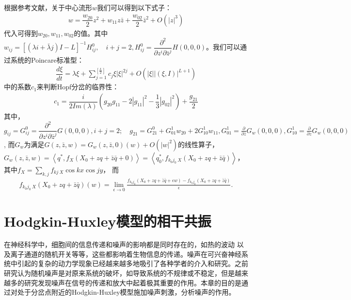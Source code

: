 \documentclass[
bachelor,
nofont, %
pdflinks,
]{xjtuthesis}
\begin{document}
根据参考文献\cite{hassard1981theory}，关于中心流形$w$我们可以得到以下式子：
\begin{align}
w=\dfrac{w_{20}}{2}z^2 +w_{11}z\bar{z}+\dfrac{w_{02}}{2}\bar{z}^2 +O(|z|^3)
\end{align}
代入可得到$w_{20},w_{11},w_{02}$的值。其中$w_{ij}=[(\lambda i+\bar{\lambda}j)I-L]^{-1}H^0_{ij},\quad i+j=2, H^0_{ij}=\dfrac{\partial^2}{\partial z^i \partial \bar{z}^j}H(0, 0, 0)$。我们可以通过系统的Poincare标准型：
\begin{align}
\dfrac{d \xi}{dt} =\lambda \xi+\sum_{j=1}^{\left[\frac{L}{2}\right]}c_j \xi|\xi|^{2j}+O(|\xi||(\xi,I)|^{L+1})
\end{align}
中的系数$c_1$来判断Hopf分岔的临界性：
\begin{align}
c_1=\dfrac{i}{2 Im(\lambda)}(g_{20}g_{11}-2|g_{11}|^2-\dfrac{1}{3}|g_{02}|^2)+\dfrac{g_{21}}{2}
\end{align}
其中，$g_{ij}=G^0_{ij}=\dfrac{\partial^2}{\partial z^i \partial \bar{z}^j}G(0, 0, 0), i + j = 2; \quad g_{21}=G^0_{21}+G^1_{01}w_{20}+2G^1_{10}w_{11},G^1_{01}=
\frac{\partial}{\partial \bar{z}} G _w (0, 0, 0), G^1_{10}=
\frac{\partial}{\partial z} G _w (0, 0, 0)$, 而$G _w$为满足$G(z, \bar{z}, w) = G _w (z, \bar{z}, 0)(w) + O(|w|^2)$的线性算子，$G _w (z, \bar{z}, w) = \left<q ^*, f _X (X_0 + zq + \bar{z}\bar{q} + 0)\right> = \left<q _0 ^*, f _{k _0j _0\ X} (X _0 + zq + \bar{z}\bar{q})\right>$，其中$f _X = \sum _{k,j} f _{kj\ X}\cos kx \cos jy$， 而
\begin{align*}
f _{k _0 j _0\ X} (X _0 + zq + \bar{z}\bar{q}) (w)= \lim _{\epsilon \to 0} \frac{f _{k _0 j _0} (X _0 + zq + \bar{z}\bar{q} + \epsilon w) - f _{k _0 j _0} (X _0 + zq + \bar{z}\bar{q})}{\epsilon}.
\end{align*}



\chapter{Hodgkin-Huxley模型的相干共振}

在神经科学中，细胞间的信息传递和噪声的影响都是同时存在的，如热的波动
以及离子通道的随机开关等等，这些都影响着生物信息的传递。噪声在可兴奋神经系统中引起的复杂的动力学现象已经越来越多地吸引了各种学者的介入和研究。之前研究认为随机噪声是对原来系统的破坏，如导致系统的不规律或不稳定，但是越来越多的研究发现噪声在信号的传递和放大中起着极其重要的作用。本章的目的是通过对处于分岔点附近的Hodgkin-Huxley模型施加噪声刺激，分析噪声的作用。
\end{document}
